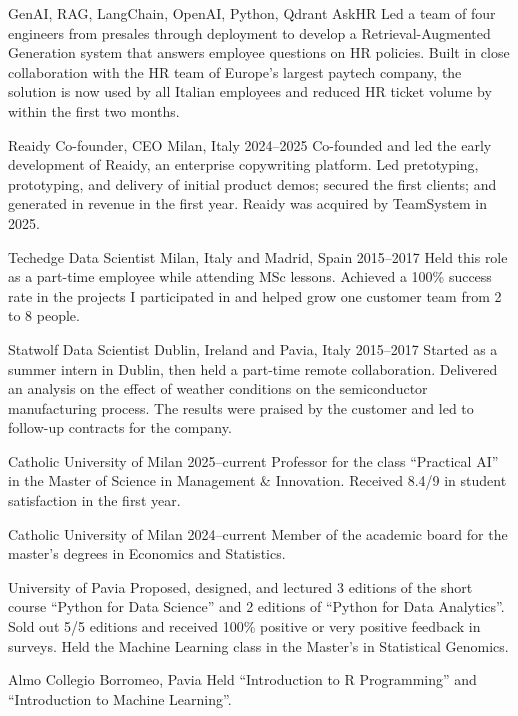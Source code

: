 \documentclass[10pt,a4paper]{article}
\begin{document}
\begin{cventries}
  \cventry
    {GenAI, RAG, LangChain, OpenAI, Python, Qdrant}
    {AskHR}
    {}
    {}
    {Led a team of four engineers from presales through deployment to develop a Retrieval-Augmented Generation system that answers employee questions on HR policies. Built in close collaboration with the HR team of Europe's largest paytech company, the solution is now used by all Italian employees and reduced HR ticket volume by  within the first two months.}

  \cventry
    {Reaidy}
    {Co-founder, CEO}
    {Milan, Italy}
    {2024--2025}
    {Co-founded and led the early development of Reaidy, an enterprise copywriting platform. Led pretotyping, prototyping, and delivery of initial product demos; secured the first clients; and generated  in revenue in the first year. Reaidy was acquired by TeamSystem in 2025.}

  \cventry
    {Techedge}
    {Data Scientist}
    {Milan, Italy and Madrid, Spain}
    {2015--2017}
    {Held this role as a part-time employee while attending MSc lessons. Achieved a 100\% success rate in the projects I participated in and helped grow one customer team from 2 to 8 people.}

  \cventry
    {Statwolf}
    {Data Scientist}
    {Dublin, Ireland and Pavia, Italy}
    {2015--2017}
    {Started as a summer intern in Dublin, then held a part-time remote collaboration. Delivered an analysis on the effect of weather conditions on the semiconductor manufacturing process. The results were praised by the customer and led to follow-up contracts for the company.}
\end{cventries}

\begin{cventries}
  \cventry
    {}
    {Catholic University of Milan}
    {}
    {2025--current}
    {Professor for the class ``Practical AI'' in the Master of Science in Management \& Innovation. Received 8.4/9 in student satisfaction in the first year.}

  \cventry
    {}
    {Catholic University of Milan}
    {}
    {2024--current}
    {Member of the academic board for the master's degrees in Economics and Statistics.}

  \cventry
    {}
    {University of Pavia}
    {}
    {}
    {Proposed, designed, and lectured 3 editions of the short course ``Python for Data Science'' and 2 editions of ``Python for Data Analytics''. Sold out 5/5 editions and received 100\% positive or very positive feedback in surveys. Held the Machine Learning class in the Master's in Statistical Genomics.}

  \cventry
    {}
    {Almo Collegio Borromeo, Pavia}
    {}
    {}
    {Held ``Introduction to R Programming'' and ``Introduction to Machine Learning''.}
\end{cventries}
\end{document}
